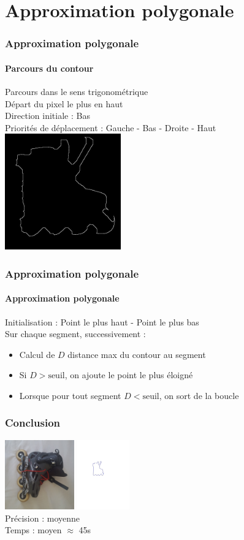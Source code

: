 \documentclass[french]{beamer}
\begin{document}
\section{Approximation polygonale}

\begin{frame}
	\frametitle{Approximation polygonale}
	\framesubtitle{Parcours du contour}
	Parcours dans le sens trigonométrique\\
	Départ du pixel le plus en haut\\
	Direction initiale : Bas \\
	Priorités de déplacement : Gauche - Bas - Droite - Haut\\
	\bigskip
	\includegraphics[width=5cm]{images/roller_contour.jpg}
\end{frame}

\begin{frame}
	\frametitle{Approximation polygonale}
	\framesubtitle{Approximation polygonale}
	Initialisation : Point le plus haut - Point le plus bas\\
	Sur chaque segment, successivement :
	\begin{itemize}
		\item Calcul de $D$ distance max du contour au segment
		\item Si $D > \text{seuil}$, on ajoute le point le plus éloigné
		\item Lorsque pour tout segment $D < \text{seuil}$, on sort de la boucle
	\end{itemize}
\end{frame}

\begin{frame}
	\frametitle{Conclusion}
	\includegraphics[height=3cm]{images/roller.png} \; \includegraphics[height=3cm]{images/roller_poly.jpg} \\
	\bigskip
	Précision : moyenne \\
	Temps : moyen $\approx$ 45s\\
\end{frame}
\end{document}
